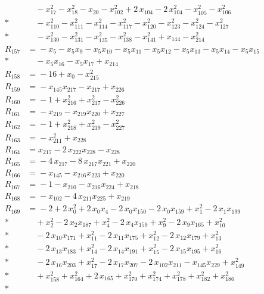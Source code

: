 \begin{align*}
&\quad{} -x_{17}^{2} -x_{18}^{2} -x_{20} -x_{102}^{2} +2\,x_{104} -2\,x_{104}^{2} -x_{105}^{2} -x_{106}^{2} \\*
&\quad{} -x_{110}^{2} -x_{111}^{2} -x_{114}^{2} -x_{117}^{2} -x_{120}^{2} -x_{123}^{2} -x_{124}^{2} -x_{127}^{2} \\*
&\quad{} -x_{130}^{2} -x_{131}^{2} -x_{135}^{2} -x_{138}^{2} -x_{141}^{2} +x_{144} -x_{214}^{2} \\[2pt]
R_{157} &={} -x_{5} -x_{5} x_{9} -x_{5} x_{10} -x_{5} x_{11} -x_{5} x_{12} -x_{5} x_{13} -x_{5} x_{14} -x_{5} x_{15} \\*
&\quad{} -x_{5} x_{16} -x_{5} x_{17} +x_{214} \\[2pt]
R_{158} &={} -16 +x_{0} -x_{215}^{2} \\[2pt]
R_{159} &={} -x_{145} x_{217} -x_{217} +x_{226} \\[2pt]
R_{160} &={} -1 +x_{216}^{2} +x_{217}^{2} -x_{226}^{2} \\[2pt]
R_{161} &={} -x_{219} -x_{219} x_{220} +x_{227} \\[2pt]
R_{162} &={} -1 +x_{218}^{2} +x_{219}^{2} -x_{227}^{2} \\[2pt]
R_{163} &={} -x_{211}^{2} +x_{228} \\[2pt]
R_{164} &={} x_{217} -2\,x_{222} x_{228} -x_{228} \\[2pt]
R_{165} &={} -4\,x_{217} -8\,x_{217} x_{221} +x_{220} \\[2pt]
R_{166} &={} -x_{145} -x_{216} x_{223} +x_{220} \\[2pt]
R_{167} &={} -1 -x_{210} -x_{216} x_{224} +x_{218} \\[2pt]
R_{168} &={} -x_{102} -4\,x_{211} x_{225} +x_{219} \\[2pt]
R_{169} &={} -2 +2\,x_{0}^{2} +2\,x_{0} x_{4} -2\,x_{0} x_{150} -2\,x_{0} x_{159} +x_{1}^{2} -2\,x_{1} x_{199} \\*
&\quad{} +x_{2}^{2} -2\,x_{2} x_{187} +x_{4}^{2} -2\,x_{4} x_{159} +x_{9}^{2} -2\,x_{9} x_{165} +x_{10}^{2} \\*
&\quad{} -2\,x_{10} x_{171} +x_{11}^{2} -2\,x_{11} x_{175} +x_{12}^{2} -2\,x_{12} x_{179} +x_{13}^{2} \\*
&\quad{} -2\,x_{13} x_{183} +x_{14}^{2} -2\,x_{14} x_{191} +x_{15}^{2} -2\,x_{15} x_{195} +x_{16}^{2} \\*
&\quad{} -2\,x_{16} x_{203} +x_{17}^{2} -2\,x_{17} x_{207} -2\,x_{102} x_{211} -x_{145} x_{229} +x_{149}^{2} \\*
&\quad{} +x_{158}^{2} +x_{164}^{2} +2\,x_{165} +x_{170}^{2} +x_{174}^{2} +x_{178}^{2} +x_{182}^{2} +x_{186}^{2} \\*

\end{align*}
